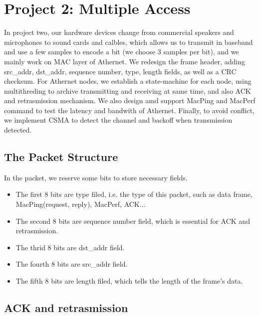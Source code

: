 \documentclass[11pt, conference]{IEEEtran}
\begin{document}
\section{Project 2: Multiple Access}

In project two, our hardware devices change from commercial speakers and microphones to sound cards and calbles, which allows us to transmit in baseband and use a few samples to 
encode a bit (we choose 3 samples per bit), and we mainly work on MAC layer of Athernet. We redesign the frame header, adding src\_addr, dst\_addr, sequence number, type, length fields,
as well as a CRC checksum. For Athernet nodes, we establish a state-machine for each node, using multithreding to archive transmitting and receiving at same time, and also ACK and retrasmission
mechanism. We also design amd support MacPing and MacPerf command to test the latency and bandwith of Athernet. Finally, to avoid conflict, we implement CSMA to detect the channel and backoff when transmission detected.

\subsection{The Packet Structure}

In the packet, we reserve some bits to store necessary fields.
\begin{itemize}
\item The first 8 bits are type filed, i.e. the type of this packet, such as data frame, MacPing(request, reply), MacPerf, ACK...
\item The second 8 bits are sequence number field, which is essential for ACK and retrasmission.
\item The thrid 8 bits are dst\_addr field. 
\item The fourth 8 bits are src\_addr field.
\item The fifth 8 bits are length filed, which tells the length of the frame's data.
\end{itemize}

\subsection{ACK and retrasmission}
\end{document}
